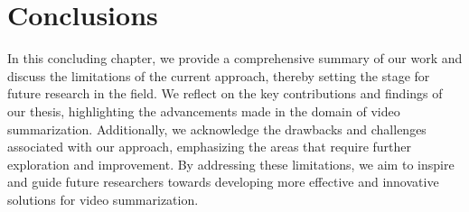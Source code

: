 \chapter{Conclusions}
\label{chapter:conclusion}

\begin{ChapAbstract}
    In this concluding chapter, we provide a comprehensive summary of our work and discuss the limitations of the current approach, thereby setting the stage for future research in the field. We reflect on the key contributions and findings of our thesis, highlighting the advancements made in the domain of video summarization. Additionally, we acknowledge the drawbacks and challenges associated with our approach, emphasizing the areas that require further exploration and improvement. By addressing these limitations, we aim to inspire and guide future researchers towards developing more effective and innovative solutions for video summarization.
\end{ChapAbstract}


